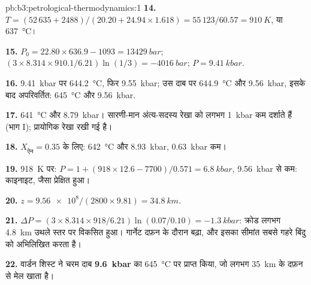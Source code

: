 \begin{solution}{pb:b3:petrological-thermodynamics:1}
\textbf{14.} $T = (52\,635 + 2488)/(20.20 + 24.94\times1.618) = 55\,123/60.57
= \qty{910}{K}$, या \qty{637}{\celsius}।

\textbf{15.} $P_0 = 22.80\times636.9 - 1093 = \qty{13429}{bar}$; $(3\times8.314
\times910.1/6.21)\ln(1/3) = \qty{-4016}{bar}$; $P = \qty{9.41}{kbar}$.

\textbf{16.} \qty{9.41}{kbar} पर \qty{644.2}{\celsius}, फिर
\qty{9.55}{kbar}; उस दाब पर \qty{644.9}{\celsius} और
\qty{9.56}{kbar}, इसके बाद अपरिवर्तित: \qty{645}{\celsius} और
\qty{9.56}{kbar}.

\textbf{17.} \qty{641}{\celsius} और \qty{8.79}{kbar}। सारणी-मान
अंत्य-सदस्य रेखा को लगभग \qty{1}{kbar} कम दर्शाते हैं (भाग I);
प्रायोगिक रेखा रखी गई है।

\textbf{18.} $X_{\text{ऐन}} = 0.35$ के लिए: \qty{642}{\celsius} और
\qty{8.93}{kbar}, \qty{0.63}{kbar} कम।

\textbf{19.} \qty{918}{K} पर: $P = 1 + (918\times12.6 - 7700)/0.571 =
\qty{6.8}{kbar}$, \qty{9.56}{kbar} से कम: काइनाइट, जैसा प्रेक्षित हुआ।

\textbf{20.} $z = \num{9.56e8}/(2800\times9.81) = \qty{34.8}{km}$.

\textbf{21.} $\Delta P = (3\times8.314\times918/6.21)\ln(0.07/0.10) =
\qty{-1.3}{kbar}$: क्रोड लगभग \qty{4.8}{km} उथले स्तर पर विकसित हुआ।
गार्नेट दफ़न के दौरान बढ़ा, और इसका सीमांत सबसे गहरे बिंदु को अभिलिखित करता है।

\textbf{22.} वार्डन शिस्ट ने चरम दाब
\textbf{\qty[text-series-to-math=true]{9.6}{kbar}} का
\qty{645}{\celsius} पर प्राप्त किया, जो लगभग \qty{35}{km} के दफ़न से मेल खाता है।
\end{solution}
